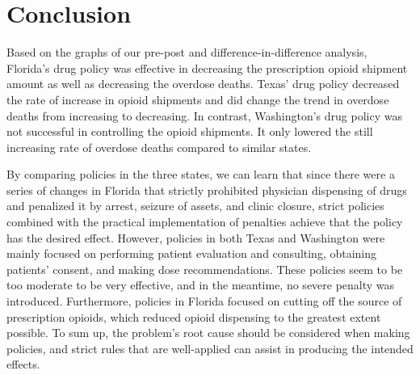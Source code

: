 \documentclass[12pt,letterpaper]{article}
\begin{document}
\section{Conclusion}


Based on the graphs of our pre-post and difference-in-difference analysis, Florida's drug policy was effective in decreasing the prescription opioid shipment amount as well as decreasing the overdose deaths. Texas' drug policy decreased the rate of increase in opioid shipments and did change the trend in overdose deaths from increasing to decreasing. In contrast, Washington's drug policy was not successful in controlling the opioid shipments. It only lowered the still increasing rate of overdose deaths compared to similar states.

By comparing policies in the three states, we can learn that since there were a series of changes in Florida that strictly prohibited physician dispensing of drugs and penalized it by arrest, seizure of assets, and clinic closure, strict policies combined with the practical implementation of penalties achieve that the policy has the desired effect. However, policies in both Texas and Washington were mainly focused on performing patient evaluation and consulting, obtaining patients' consent, and making dose recommendations. These policies seem to be too moderate to be very effective, and in the meantime, no severe penalty was introduced. Furthermore, policies in Florida focused on cutting off the source of prescription opioids, which reduced opioid dispensing to the greatest extent possible. To sum up, the problem's root cause should be considered when making policies, and strict rules that are well-applied can assist in producing the intended effects.
\end{document}
